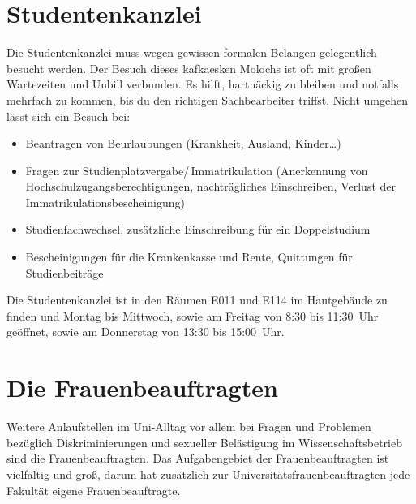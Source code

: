 \begin{urlList}
\end{urlList}

\section{Studentenkanzlei}

Die Studentenkanzlei muss wegen gewissen formalen Belangen
gelegentlich besucht werden. Der Besuch dieses kafkaesken Molochs ist
oft mit großen Wartezeiten und Unbill verbunden. Es hilft, hartnäckig
zu bleiben und notfalls mehrfach zu kommen, bis du den richtigen
Sachbearbeiter triffst. Nicht umgehen lässt sich ein Besuch bei:

\begin{itemize}
\item Beantragen von Beurlaubungen (Krankheit, Ausland, Kinder\ldots)
\item Fragen zur Studienplatzvergabe/\,Immatrikulation (Anerkennung von Hochschulzugangsberechtigungen, nachträgliches Einschreiben, Verlust der Immatrikulationsbescheinigung)
\item Studienfachwechsel, zusätzliche Einschreibung für ein Doppelstudium
\item Bescheinigungen für die Krankenkasse und Rente, Quittungen für Studienbeiträge
\end{itemize}

Die Studentenkanzlei ist in den Räumen E011 und E114 im Hautgebäude zu finden und Montag bis Mittwoch, sowie am Freitag von 8:30 bis 11:30~Uhr geöffnet, sowie am Donnerstag von 13:30 bis 15:00~Uhr.

\begin{urlList}
\end{urlList}

%

\section{Die Frauenbeauftragten}
Weitere Anlaufstellen im Uni-Alltag vor allem bei Fragen und Problemen bezüglich Diskriminierungen und sexueller Belästigung im Wissenschaftsbetrieb sind die Frauenbeauftragten.
Das Aufgabengebiet der Frauenbeauftragten ist vielfältig und groß, darum hat zusätzlich zur Universitätsfrauenbeauftragten jede Fakultät eigene Frauenbeauftragte.


